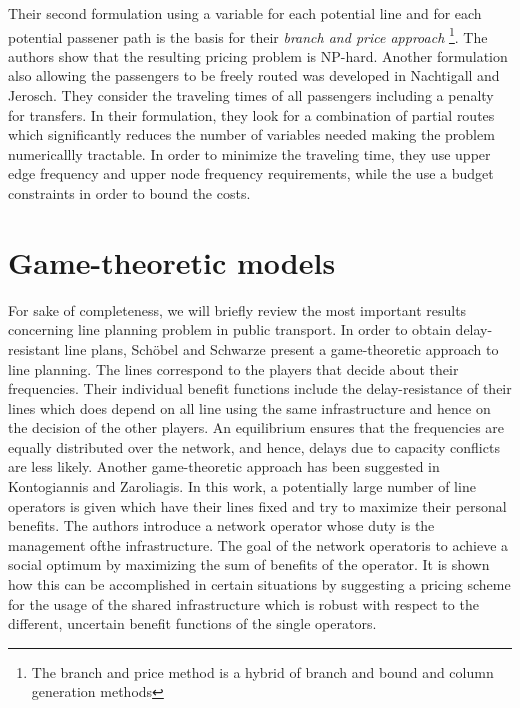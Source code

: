 \documentclass[
  twoside,
  11pt, a4paper,
  footinclude=true,
  headinclude=true,
  cleardoublepage=empty
]{scrbook}
\theoremstyle{definition}
\begin{document}
Their second formulation using a variable for each potential line and for each potential passener path is the basis for their \emph{branch and price approach} \footnote{The branch and price method is a hybrid of branch and bound and column generation methods}. The authors show that the resulting pricing problem is NP-hard. \newline
Another formulation also allowing the passengers to be freely routed was developed in Nachtigall and Jerosch. They consider the traveling times of all passengers including a penalty for transfers. In their formulation, they look for a combination of partial routes which significantly reduces the number of variables needed making the problem numericallly tractable. In order to minimize the traveling time, they use upper edge frequency and upper node frequency requirements, while the use a budget constraints in order to bound the costs. \newline

\section{Game-theoretic models}
For sake of completeness, we will briefly review the most important results concerning line planning problem in public transport. \newline
In order to obtain delay-resistant line plans, Sch\"{o}bel and Schwarze present a game-theoretic approach to line planning. The lines correspond to the players that decide about their frequencies. Their individual benefit functions include the delay-resistance of their lines which does depend on all line using the same infrastructure and hence on the decision of the other players. An equilibrium ensures that the frequencies are equally distributed over the network, and hence, delays due to capacity conflicts are less likely. \newline
Another game-theoretic approach has been suggested in Kontogiannis and Zaroliagis. In this work, a potentially large number of line operators is given which have their lines fixed and try to maximize their personal benefits. The authors introduce a network operator whose duty is the management ofthe infrastructure. The goal of the network operatoris to achieve a social optimum by maximizing the sum of benefits of the operator. It is shown how this can be accomplished in certain situations by suggesting a pricing scheme for the usage of the shared infrastructure which is robust with respect to the different, uncertain benefit functions of the single operators.
\end{document}
